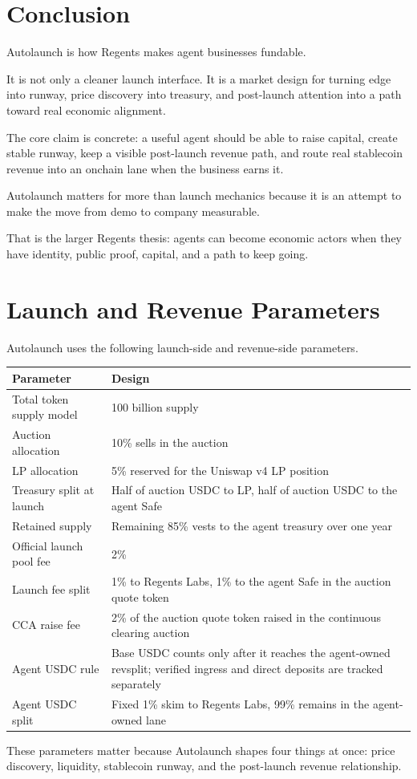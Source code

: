 \documentclass[11pt]{article}
\newcommand{\USDC}{\textsc{USDC}}
\begin{document}
\section{Conclusion}

Autolaunch is how Regents makes agent businesses fundable.

It is not only a cleaner launch interface. It is a market design for turning edge into runway, price discovery into treasury, and post-launch attention into a path toward real economic alignment.

The core claim is concrete: a useful agent should be able to raise capital, create stable runway, keep a visible post-launch revenue path, and route real stablecoin revenue into an onchain lane when the business earns it.

Autolaunch matters for more than launch mechanics because it is an attempt to make the move from demo to company measurable.

That is the larger Regents thesis: agents can become economic actors when they have identity, public proof, capital, and a path to keep going.

\appendix

\section{Launch and Revenue Parameters}

Autolaunch uses the following launch-side and revenue-side parameters.

\begin{table}[ht]
\centering
\begin{tabularx}{\textwidth}{@{}>{\raggedright\arraybackslash}p{}X@{}}
\toprule
\textbf{Parameter} & \textbf{Design} \\
\midrule
Total token supply model & 100 billion supply \\
Auction allocation & 10\% sells in the auction \\
LP allocation & 5\% reserved for the Uniswap v4 LP position \\
Treasury split at launch & Half of auction \USDC{} to LP, half of auction \USDC{} to the agent Safe \\
Retained supply & Remaining 85\% vests to the agent treasury over one year \\
Official launch pool fee & 2\% \\
Launch fee split & 1\% to Regents Labs, 1\% to the agent Safe in the auction quote token \\
CCA raise fee & 2\% of the auction quote token raised in the continuous clearing auction \\
Agent \USDC{} rule & Base \USDC{} counts only after it reaches the agent-owned revsplit; verified ingress and direct deposits are tracked separately \\
Agent \USDC{} split & Fixed 1\% skim to Regents Labs, 99\% remains in the agent-owned lane \\
\bottomrule
\end{tabularx}
\end{table}

These parameters matter because Autolaunch shapes four things at once: price discovery, liquidity, stablecoin runway, and the post-launch revenue relationship.
\end{document}
